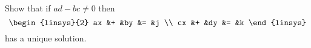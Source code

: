 \index{}


\begin{Exercise}[
name={},
title={}, 
difficulty=0,
origin={\cite{JH}}]
Show that if \( ad-bc\neq 0 \) then
\begin{equation*}
\begin{linsys}{2}
ax  &+  &by  &=  &j  \\
cx  &+  &dy  &=  &k  
\end{linsys}
\end{equation*}
has a unique solution.
\end{Exercise}

